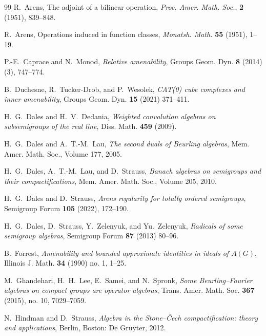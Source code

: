 \documentclass[twoside,11pt]{amsart}
\numberwithin{equation}{section}
\theoremstyle{definition}
\newcommand{\1}{\mathbbm{1}}
\begin{document}
	
	
	
	
	
	
	\begin{thebibliography}{99}
		 R.\ Arens, The adjoint of a bilinear operation, \emph{Proc. Amer. Math. Soc.}, \textbf{2} (1951), 839--848.
		\vskip 2mm
		
		 R.\ Arens, Operations induced in function classes, \emph{Monatsh. Math.} \textbf{55} (1951), 1--19.	
		\vskip 2mm
		
		 P.-E.\ Caprace and N.\ Monod, \emph{Relative amenability}, Groups Geom. Dyn. \textbf{8} (2014) (3), 747--774.
		\vskip 2mm	
		
		 B.\ Duchesne, R.\ Tucker-Drob, and P.\ Wesolek, \emph{CAT(0) cube complexes and inner amenability}, Groups Geom. Dyn. \textbf{15} (2021) 371--411.
		\vskip 2mm
		
		 H.\ G.\ Dales and H.\ V.\ Dedania, \emph{Weighted convolution algebras on subsemigroups of the real line}, Diss. Math. \textbf{459} (2009).
		\vskip 2mm
		
		
		 H.\ G.\ Dales and A.\ T.-M.\ Lau, \emph{The second duals of Beurling algebras}, Mem. Amer. Math. Soc., Volume 177, 2005.
		\vskip 2mm
		
		 H.\ G.\ Dales,  A.\ T.-M.\ Lau, and D.\ Strauss, \emph{Banach algebras on semigroups and their compactifications},  Mem. Amer. Math. Soc., Volume 205, 2010.
		\vskip 2mm
		
		 H.\ G.\ Dales and D.\ Strauss, \emph{Arens regularity for totally ordered semigroups}, Semigroup Forum \textbf{105} (2022), 172--190.
		\vskip 2mm
		
		 H.\ G.\ Dales, D.\ Strauss, Y.\ Zelenyuk, and Yu.\ Zelenyuk, \emph{Radicals of some semigroup algebras}, Semigroup Forum \textbf{87} (2013) 80--96.
		\vskip 2mm
		
		 B.\ Forrest, \emph{Amenability and bounded approximate identities in ideals of $A(G)$}, Illinois J. Math. \textbf{34} (1990) no. 1, 1--25.
		\vskip 2mm
		
		 M.\ Ghandehari, H.\ H.\ Lee, E.\ Samei, and N.\ Spronk, \emph{Some Beurling--Fourier algebras on compact groups are operator algebras}, Trans. Amer. Math. Soc. \textbf{367} (2015), no. 10, 7029--7059.
		\vskip 2mm
		
		 N.\ Hindman and D.\ Strauss, \emph{Algebra in the Stone--{\v C}ech compactification: theory and applications}, Berlin, Boston: De Gruyter, 2012.
		\vskip 2mm
		

\end{thebibliography}
\end{document}
